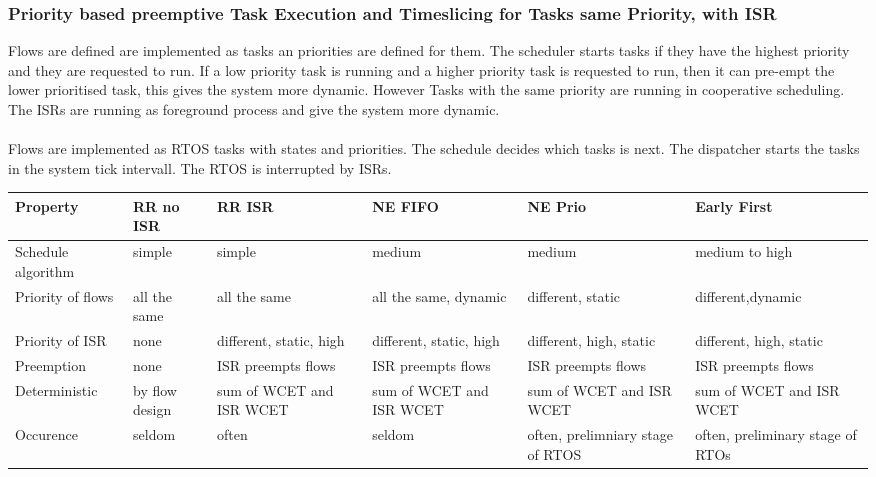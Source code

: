 \subsubsection{Priority based preemptive Task Execution and Timeslicing for Tasks same Priority, with ISR}
Flows are defined are implemented as tasks an priorities are defined for them.
The scheduler starts tasks if they have the highest priority and they are requested to run.
If a low priority task is running and a higher priority task is requested to run, then it can pre-empt the lower prioritised task, this gives the system more dynamic.
However Tasks with the same priority are running in cooperative scheduling.
The ISRs are running as foreground process and give the system more dynamic.\\
\\
Flows are implemented as RTOS tasks with states and priorities.
The schedule decides which tasks is next.
The dispatcher starts the tasks in the system tick intervall.
The RTOS is interrupted by ISRs.

\clearpage
\begin{sidewaystable}
  \begin{tabularx}{\textwidth}{l X X X X X}
    \hline
    Property           & RR no ISR      & RR ISR                   & NE FIFO                  & NE Prio                          & Early First                      \\\hline
    Schedule algorithm & simple         & simple                   & medium                   & medium                           & medium to high                   \\
    Priority of flows  & all the same   & all the same             & all the same, dynamic    & different, static                & different,dynamic                \\
    Priority of ISR    & none           & different, static, high  & different, static, high  & different, high, static          & different, high, static          \\
    Preemption         & none           & ISR preempts flows       & ISR preempts flows       & ISR preempts flows               & ISR preempts flows               \\
    Deterministic      & by flow design & sum of WCET and ISR WCET & sum of WCET and ISR WCET & sum of WCET and ISR WCET         & sum of WCET and ISR WCET         \\
    Occurence          & seldom         & often                    & seldom                   & often, prelimniary stage of RTOS & often, preliminary stage of RTOs \\\hline
  \end{tabularx}
\end{sidewaystable}

